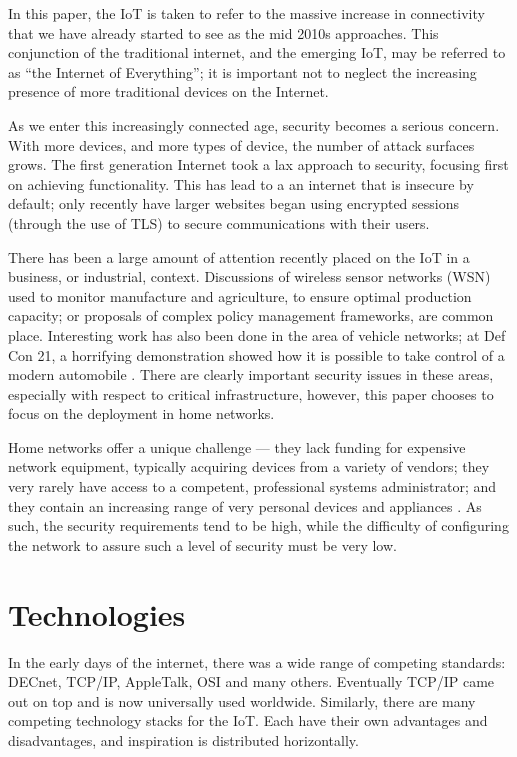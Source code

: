 \documentclass[12pt,journal,compsoc]{IEEEtran}
\begin{document}
In this paper, the IoT is taken to refer to the massive increase in
connectivity that we have already started to see as the mid 2010s approaches.
This conjunction of the traditional internet, and the emerging IoT, may be
referred to as ``the Internet of Everything''; it is important not to neglect
the increasing presence of more traditional devices on the Internet. 

As we enter this increasingly connected age, security becomes a serious
concern. With more devices, and more types of device, the number of attack
surfaces grows. The first generation Internet took a lax approach to security,
focusing first on achieving functionality. This has lead to a an internet that
is insecure by default; only recently have larger websites began using
encrypted sessions (through the use of TLS) to secure communications with their
users. 

There has been a large amount of attention recently placed on the IoT in a
business, or industrial, context. Discussions of wireless sensor networks (WSN)
used to monitor manufacture and agriculture, to ensure optimal production
capacity; or proposals of complex policy management frameworks, are common
place. Interesting work has also been done in the area of vehicle networks; at
Def Con 21, a horrifying demonstration showed how it is possible to take
control of a modern automobile \cite{Illera2014}. There are clearly important
security issues in these areas, especially with respect to critical
infrastructure, however, this paper chooses to focus on the deployment in home
networks. 

Home networks offer a unique challenge — they lack funding for expensive
network equipment, typically acquiring devices from a variety of vendors; they
very rarely have access to a competent, professional systems administrator; and
they contain an increasing range of very personal devices and appliances
\cite{ACM_ModHome}. As such, the security requirements tend to be high, while
the difficulty of configuring the network to assure such a level of security
must be very low. 


\section{Technologies}
In the early days of the internet, there was a wide range of competing
standards: DECnet, TCP/IP, AppleTalk, OSI and many others.  Eventually TCP/IP
came out on top and is now universally used worldwide. Similarly, there are
many competing technology stacks for the IoT. Each have their own advantages
and disadvantages, and inspiration is distributed horizontally. 
\end{document}

